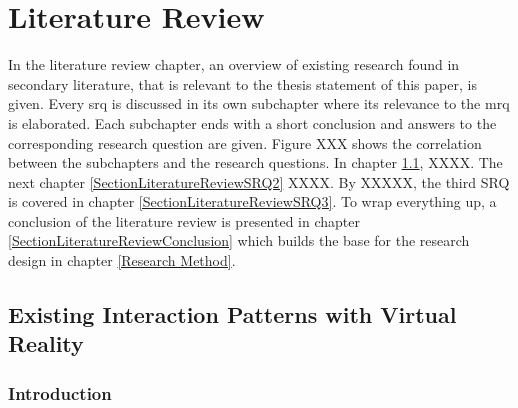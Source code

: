 
\chapter{Literature Review} %

\label{ChapterLiteratureReview} %

In the literature review chapter, an overview of existing research found in secondary literature, that is relevant to the thesis statement of this paper, is given. Every \gls{srq} is discussed in its own subchapter where its relevance to the \gls{mrq} is elaborated. Each subchapter ends with a short conclusion and answers to the corresponding research question are given.
Figure XXX shows the correlation between the subchapters and the research questions. In chapter \ref{SectionLiteratureReviewSRQ1}, XXXX. The next chapter \ref{SectionLiteratureReviewSRQ2} XXXX. By XXXXX, the third SRQ is covered in chapter \ref{SectionLiteratureReviewSRQ3}. To wrap everything up, a conclusion of the literature review is presented in chapter \ref{SectionLiteratureReviewConclusion} which builds the base for the research design in chapter \ref{Research Method}.




\section{Existing Interaction Patterns with Virtual Reality}

\label{SectionLiteratureReviewSRQ1}

\subsection{Introduction}

